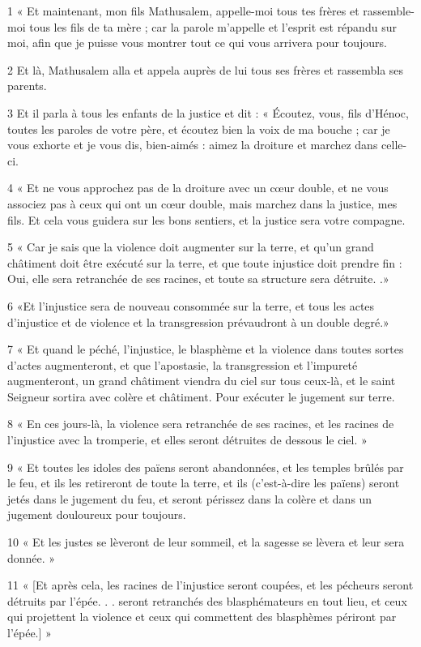 \par 1 « Et maintenant, mon fils Mathusalem, appelle-moi tous tes frères et rassemble-moi tous les fils de ta mère ; car la parole m'appelle et l'esprit est répandu sur moi, afin que je puisse vous montrer tout ce qui vous arrivera pour toujours.
\par 2 Et là, Mathusalem alla et appela auprès de lui tous ses frères et rassembla ses parents.
\par 3 Et il parla à tous les enfants de la justice et dit : « Écoutez, vous, fils d'Hénoc, toutes les paroles de votre père, et écoutez bien la voix de ma bouche ; car je vous exhorte et je vous dis, bien-aimés : aimez la droiture et marchez dans celle-ci.
\par 4 « Et ne vous approchez pas de la droiture avec un cœur double, et ne vous associez pas à ceux qui ont un cœur double, mais marchez dans la justice, mes fils. Et cela vous guidera sur les bons sentiers, et la justice sera votre compagne.
\par 5 « Car je sais que la violence doit augmenter sur la terre, et qu'un grand châtiment doit être exécuté sur la terre, et que toute injustice doit prendre fin : Oui, elle sera retranchée de ses racines, et toute sa structure sera détruite. .»
\par 6 «Et l'injustice sera de nouveau consommée sur la terre, et tous les actes d'injustice et de violence et la transgression prévaudront à un double degré.»
\par 7 « Et quand le péché, l'injustice, le blasphème et la violence dans toutes sortes d'actes augmenteront, et que l'apostasie, la transgression et l'impureté augmenteront, un grand châtiment viendra du ciel sur tous ceux-là, et le saint Seigneur sortira avec colère et châtiment. Pour exécuter le jugement sur terre.
\par 8 « En ces jours-là, la violence sera retranchée de ses racines, et les racines de l'injustice avec la tromperie, et elles seront détruites de dessous le ciel. »
\par 9 « Et toutes les idoles des païens seront abandonnées, et les temples brûlés par le feu, et ils les retireront de toute la terre, et ils (c'est-à-dire les païens) seront jetés dans le jugement du feu, et seront périssez dans la colère et dans un jugement douloureux pour toujours.
\par 10 « Et les justes se lèveront de leur sommeil, et la sagesse se lèvera et leur sera donnée. »
\par 11 « [Et après cela, les racines de l'injustice seront coupées, et les pécheurs seront détruits par l'épée. . . seront retranchés des blasphémateurs en tout lieu, et ceux qui projettent la violence et ceux qui commettent des blasphèmes périront par l'épée.] »
